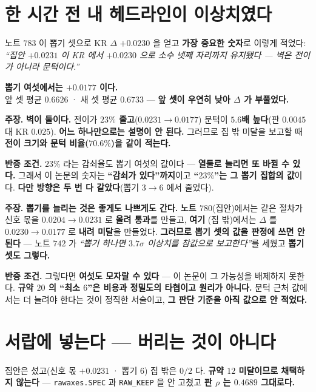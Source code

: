 \documentclass[10pt,a4paper]{article}
\newcommand{\claim}[2]{\begin{claimbox}\textbf{주장.} #1\par\smallskip
  \textcolor{gray!70}{\textbf{반증 조건.} #2}\end{claimbox}}
\begin{document}
\section{한 시간 전 내 헤드라인이 이상치였다}

노트 $783$ 이 뽑기 셋으로 KR $\Delta$ $+0.0230$ 을 얻고 \textbf{가장 중요한 숫자}로
이렇게 적었다: \emph{``집안 $+0.0231$ 이 KR 에서 $+0.0230$ 으로 소수 넷째 자리까지
유지됐다 --- 벽은 전이가 아니라 문턱이다.''}

\begin{center}
\textbf{뽑기 여섯에서는 $+0.0177$ 이다.}\\
앞 셋 평균 $0.6626$ · 새 셋 평균 $0.6733$ --- \textbf{앞 셋이 우연히 낮아 $\Delta$ 가
부풀었다.}
\end{center}

\claim{\textbf{벽이 둘이다.} 전이가 \textbf{$23\%$ 줄고}($0.0231 \to 0.0177$) 문턱이
\textbf{$5.6$배 높다}(판 $0.0045$ 대 KR $0.025$). \textbf{어느 하나만으로는 설명이 안
된다.} 그러므로 집 밖 미달을 보고할 때 \textbf{전이 크기와 문턱 비율($70.6\%$)을 같이
적는다.}}
{$23\%$ 라는 감쇠율도 뽑기 여섯의 값이다 --- \textbf{열둘로 늘리면 또 바뀔 수 있다.}
그래서 이 논문의 숫자는 \textbf{``감쇠가 있다''까지}이고 \textbf{``$23\%$''는 그 뽑기
집합의 값}이다. \textbf{다만 방향은 두 번 다 같았다}(뽑기 $3 \to 6$ 에서 줄었다).}

\claim{\textbf{뽑기를 늘리는 것은 좋게도 나쁘게도 간다.} \textbf{노트 $780$}(집안)에서는
같은 절차가 신호 몫을 $0.0204 \to 0.0231$ 로 \textbf{올려 통과}를 만들고, \textbf{여기}
(집 밖)에서는 $\Delta$ 를 $0.0230 \to 0.0177$ 로 \textbf{내려 미달}을 만들었다.
\textbf{그러므로 뽑기 셋의 값을 판정에 쓰면 안 된다} --- 노트 $742$ 가 \emph{``뽑기 하나면
$3.7\sigma$ 이상치를 참값으로 보고한다''}를 세웠고 \textbf{뽑기 셋도 그렇다.}}
{그렇다면 \textbf{여섯도 모자랄 수 있다} --- 이 논문이 그 가능성을 배제하지 못한다.
\textbf{규약 $20$ 의 ``최소 $6$''은 비용과 정밀도의 타협이고 원리가 아니다.} 문턱 근처
값에서는 더 늘려야 한다는 것이 정직한 서술이고, \textbf{그 판단 기준을 아직 값으로 안
적었다.}}

\section{서랍에 넣는다 --- 버리는 것이 아니다}

집안은 섰고(신호 몫 $+0.0231$ · 뽑기 $6$) 집 밖은 $0/2$ 다. \textbf{규약 $12$ 미달이므로
채택하지 않는다} --- \texttt{rawaxes.SPEC} 과 \texttt{RAW\_KEEP} 을 안 고쳤고 \textbf{판
$\rho$ 는 $0.4689$ 그대로다.}
\end{document}
